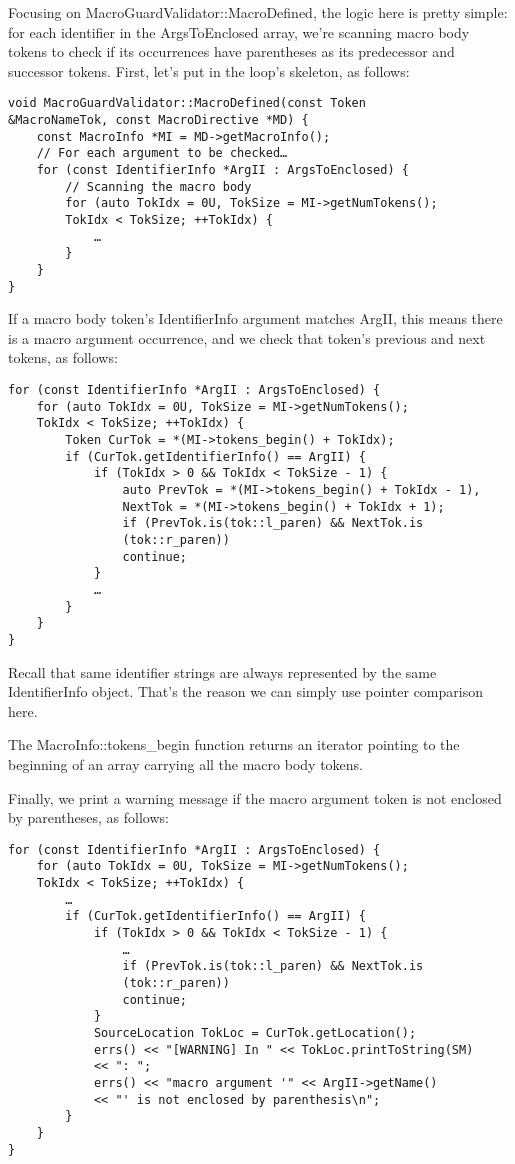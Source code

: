 Focusing on MacroGuardValidator::MacroDefined, the logic here is pretty simple: for each identifier in the ArgsToEnclosed array, we're scanning macro body tokens to check if its occurrences have parentheses as its predecessor and successor tokens. First, let's put in the loop's skeleton, as follows:

\begin{lstlisting}[style=styleCXX]
void MacroGuardValidator::MacroDefined(const Token
&MacroNameTok, const MacroDirective *MD) {
	const MacroInfo *MI = MD->getMacroInfo();
	// For each argument to be checked…
	for (const IdentifierInfo *ArgII : ArgsToEnclosed) {
		// Scanning the macro body
		for (auto TokIdx = 0U, TokSize = MI->getNumTokens();
		TokIdx < TokSize; ++TokIdx) {
			…
		}
	}
}
\end{lstlisting}

If a macro body token's IdentifierInfo argument matches ArgII, this means there is a macro argument occurrence, and we check that token's previous and next tokens, as follows:

\begin{lstlisting}[style=styleCXX]
for (const IdentifierInfo *ArgII : ArgsToEnclosed) {
	for (auto TokIdx = 0U, TokSize = MI->getNumTokens();
	TokIdx < TokSize; ++TokIdx) {
		Token CurTok = *(MI->tokens_begin() + TokIdx);
		if (CurTok.getIdentifierInfo() == ArgII) {
			if (TokIdx > 0 && TokIdx < TokSize - 1) {
				auto PrevTok = *(MI->tokens_begin() + TokIdx - 1),
				NextTok = *(MI->tokens_begin() + TokIdx + 1);
				if (PrevTok.is(tok::l_paren) && NextTok.is
				(tok::r_paren))
				continue;
			}
			…
		}
	}
}
\end{lstlisting}

\begin{tcolorbox}[colback=blue!5!white,colframe=blue!75!black, fonttitle=\bfseries,title=Uniqueness of IdentifierInfo instances]
\hspace*{0.7cm}Recall that same identifier strings are always represented by the same IdentifierInfo object. That's the reason we can simply use pointer comparison here.
\end{tcolorbox}

The MacroInfo::tokens\_begin function returns an iterator pointing to the beginning of an array carrying all the macro body tokens.

Finally, we print a warning message if the macro argument token is not enclosed by parentheses, as follows:

\begin{lstlisting}[style=styleCXX]
for (const IdentifierInfo *ArgII : ArgsToEnclosed) {
	for (auto TokIdx = 0U, TokSize = MI->getNumTokens();
	TokIdx < TokSize; ++TokIdx) {
		…
		if (CurTok.getIdentifierInfo() == ArgII) {
			if (TokIdx > 0 && TokIdx < TokSize - 1) {
				…
				if (PrevTok.is(tok::l_paren) && NextTok.is
				(tok::r_paren))
				continue;
			}
			SourceLocation TokLoc = CurTok.getLocation();
			errs() << "[WARNING] In " << TokLoc.printToString(SM)
			<< ": ";
			errs() << "macro argument '" << ArgII->getName()
			<< "' is not enclosed by parenthesis\n";
		}
	}
}
\end{lstlisting}

